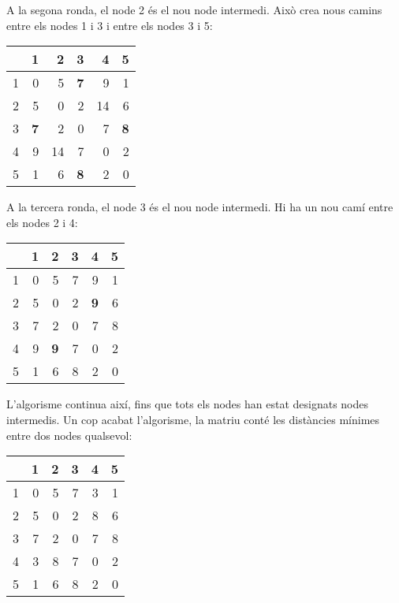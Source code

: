 A la segona ronda, el node 2 és el nou node intermedi. Això crea nous
camins entre els nodes 1 i 3 i entre els nodes 3 i 5:


\begin{center}
\begin{tabular}{r|rrrrr}
 & 1 & 2 & 3 & 4 & 5 \\
\hline
1 & 0 & 5 & \textbf{7} & 9 & 1 \\
2 & 5 & 0 & 2 & 14 & 6 \\
3 & \textbf{7} & 2 & 0 & 7 & \textbf{8} \\
4 & 9 & 14 & 7 & 0 & 2 \\
5 & 1 & 6 & \textbf{8} & 2 & 0 \\
\end{tabular}
\end{center}
\vspace{10pt}

A la tercera ronda, el node 3 és el nou node intermedi. Hi ha un nou
camí entre els nodes 2 i 4:


\begin{center}
\begin{tabular}{r|rrrrr}
 & 1 & 2 & 3 & 4 & 5 \\
\hline
1 & 0 & 5 & 7 & 9 & 1 \\
2 & 5 & 0 & 2 & \textbf{9} & 6 \\
3 & 7 & 2 & 0 & 7 & 8 \\
4 & 9 & \textbf{9} & 7 & 0 & 2 \\
5 & 1 & 6 & 8 & 2 & 0 \\
\end{tabular}
\end{center}
\vspace{10pt}

L'algorisme continua així, fins que tots els nodes han estat designats
nodes intermedis. Un cop acabat l'algorisme, la matriu conté les
distàncies mínimes entre dos nodes qualsevol:


\begin{center}
\begin{tabular}{r|rrrrr}
 & 1 & 2 & 3 & 4 & 5 \\
\hline
1 & 0 & 5 & 7 & 3 & 1 \\
2 & 5 & 0 & 2 & 8 & 6 \\
3 & 7 & 2 & 0 & 7 & 8 \\
4 & 3 & 8 & 7 & 0 & 2 \\
5 & 1 & 6 & 8 & 2 & 0 \\
\end{tabular}
\end{center}


